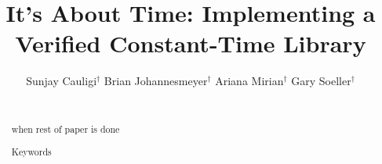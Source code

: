 \documentclass{sig-alternate-10pt}
\newcommand{\tk}{{\color{red}{\bf TK}}\xspace}
\newcommand{\TK}{\tk}
\begin{document}
\title{It's About Time: Implementing a Verified Constant-Time Library}

\author{
\alignauthor%
Sunjay Cauligi$^\dagger$\qquad
Brian Johannesmeyer$^\dagger$\qquad
Ariana Mirian$^\dagger$\qquad
Gary Soeller$^\dagger$\qquad
\smallskip\\\\%
}

\maketitle
\thispagestyle{empty}

\newcommand{\update}[1]{{\color{blue}#1}\xspace}

\newcommand{\twolinecell}[2][r]{%
  \begin{tabular}[#1]{@{}c@{}}#2\end{tabular}}



\pagestyle{plain}
\thispagestyle{empty}

\begin{abstract}
\TK when rest of paper is done

\begin{keywords}
Keywords
\end{keywords}
\end{abstract}











\end{document}
